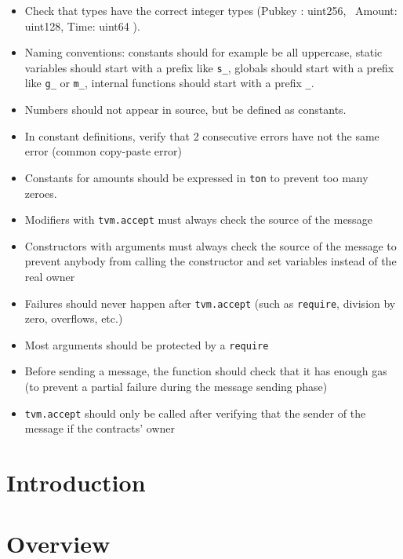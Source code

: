 \documentclass{report}
\newif\ifsolmodules
\begin{document}
\begin{itemize}
\item Check that types have the correct integer types (Pubkey : uint256, \
   Amount: uint128, Time: uint64 ).
\item Naming conventions: constants should for example be all uppercase, static variables should start with a prefix like \verb+s_+, globals should start with a prefix like \verb+g_+ or \verb+m_+, internal functions should start with a prefix \verb+_+.
\item Numbers should not appear in source, but be defined as constants.
\item In constant definitions, verify that 2 consecutive errors have not the same error (common copy-paste error)
\item Constants for amounts should be expressed in \verb+ton+ to prevent too many zeroes.
\item Modifiers with {\tt tvm.accept} must always check the source of the message
\item Constructors with arguments must always check the source of the message to prevent anybody from calling the constructor and set variables instead of the real owner
\item Failures should never happen after {\tt tvm.accept} (such as {\tt require}, division by zero, overflows, etc.)
\item Most arguments should be protected by a {\tt require}
\item Before sending a message, the function should check that it has enough gas (to prevent a partial failure during the message sending phase)
\item {\tt tvm.accept} should only be called after verifying that the sender of the message if the contracts' owner
\end{itemize}
\fi

\chapter{Introduction}


\chapter{Overview}


%


\end{document}
